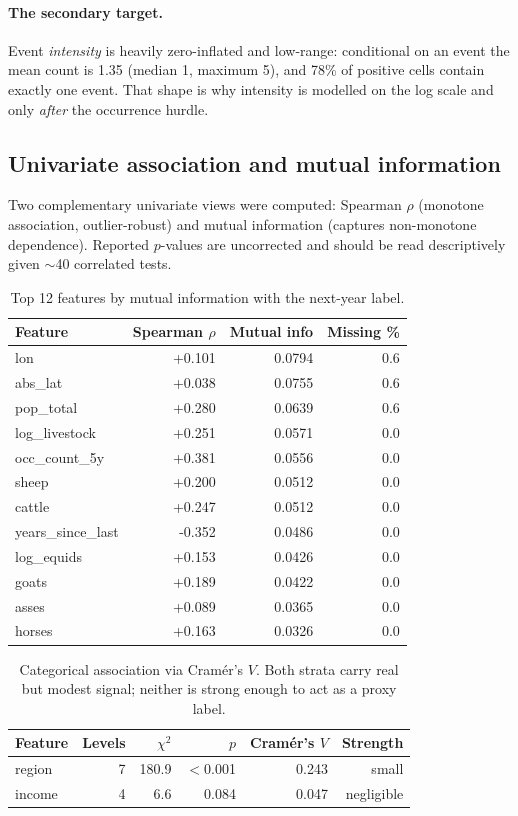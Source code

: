 \documentclass[11pt]{article}
\begin{document}
\paragraph{The secondary target.} Event \emph{intensity} is heavily zero-inflated and
low-range: conditional on an event the mean count is 1.35
(median 1, maximum
5), and 78\%
of positive cells contain exactly one event. That shape is why intensity is modelled on the log
scale and only \emph{after} the occurrence hurdle.

\subsection{Univariate association and mutual information}

Two complementary univariate views were computed: Spearman $\rho$ (monotone association,
outlier-robust) and mutual information (captures non-monotone dependence). Reported $p$-values are
uncorrected and should be read descriptively given $\sim$40 correlated tests.

\begin{table}[H]
\centering
\caption{Top 12 features by mutual information with the next-year label.}
\label{tab:mi}
\small
\begin{tabular}{@{}lrrr@{}}
\toprule
\textbf{Feature} & \textbf{Spearman $\rho$} & \textbf{Mutual info} & \textbf{Missing \%} \\
\midrule
lon & +0.101 & 0.0794 & 0.6 \\
abs\_lat & +0.038 & 0.0755 & 0.6 \\
pop\_total & +0.280 & 0.0639 & 0.6 \\
log\_livestock & +0.251 & 0.0571 & 0.0 \\
occ\_count\_5y & +0.381 & 0.0556 & 0.0 \\
sheep & +0.200 & 0.0512 & 0.0 \\
cattle & +0.247 & 0.0512 & 0.0 \\
years\_since\_last & -0.352 & 0.0486 & 0.0 \\
log\_equids & +0.153 & 0.0426 & 0.0 \\
goats & +0.189 & 0.0422 & 0.0 \\
asses & +0.089 & 0.0365 & 0.0 \\
horses & +0.163 & 0.0326 & 0.0 \\
\bottomrule
\end{tabular}
\end{table}

\begin{table}[H]
\centering
\caption{Categorical association via Cram\'er's $V$. Both strata carry real but modest
signal; neither is strong enough to act as a proxy label.}
\label{tab:cramersv}
\small
\begin{tabular}{@{}lrrrrr@{}}
\toprule
\textbf{Feature} & \textbf{Levels} & \textbf{$\chi^2$} & \textbf{$p$} & \textbf{Cram\'er's $V$} & \textbf{Strength} \\
\midrule
region & 7 & 180.9 & $<$0.001 & 0.243 & small \\
income & 4 & 6.6 & 0.084 & 0.047 & negligible \\
\bottomrule
\end{tabular}
\end{table}
\end{document}
